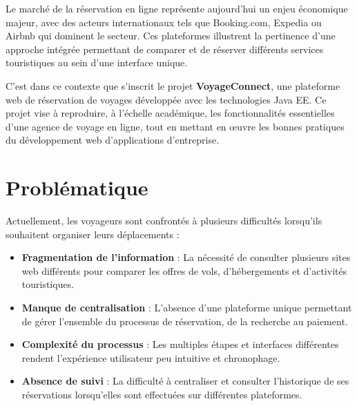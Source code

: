 \documentclass[12pt,a4paper]{report}
\begin{document}
\vspace{0.3cm}

Le marché de la réservation en ligne représente aujourd'hui un enjeu économique majeur, avec des acteurs internationaux tels que Booking.com, Expedia ou Airbnb qui dominent le secteur. Ces plateformes illustrent la pertinence d'une approche intégrée permettant de comparer et de réserver différents services touristiques au sein d'une interface unique.

\vspace{0.3cm}

C'est dans ce contexte que s'inscrit le projet \textbf{VoyageConnect}, une plateforme web de réservation de voyages développée avec les technologies Java EE. Ce projet vise à reproduire, à l'échelle académique, les fonctionnalités essentielles d'une agence de voyage en ligne, tout en mettant en œuvre les bonnes pratiques du développement web d'applications d'entreprise.

\section*{Problématique}

Actuellement, les voyageurs sont confrontés à plusieurs difficultés lorsqu'ils souhaitent organiser leurs déplacements :

\begin{itemize}
    \item \textbf{Fragmentation de l'information} : La nécessité de consulter plusieurs sites web différents pour comparer les offres de vols, d'hébergements et d'activités touristiques.
    
    \item \textbf{Manque de centralisation} : L'absence d'une plateforme unique permettant de gérer l'ensemble du processus de réservation, de la recherche au paiement.
    
    \item \textbf{Complexité du processus} : Les multiples étapes et interfaces différentes rendent l'expérience utilisateur peu intuitive et chronophage.
    
    \item \textbf{Absence de suivi} : La difficulté à centraliser et consulter l'historique de ses réservations lorsqu'elles sont effectuées sur différentes plateformes.
\end{itemize}

\vspace{0.3cm}
\end{document}
